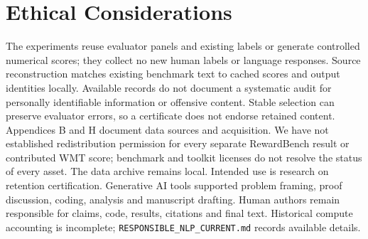 \documentclass[11pt]{article}
\begin{document}
\section*{Ethical Considerations}
The experiments reuse evaluator panels and existing labels or generate controlled numerical scores; they collect no new human labels or language responses. Source reconstruction matches existing benchmark text to cached scores and output identities locally. Available records do not document a systematic audit for personally identifiable information or offensive content. Stable selection can preserve evaluator errors, so a certificate does not endorse retained content. Appendices B and H document data sources and acquisition. We have not established redistribution permission for every separate RewardBench result or contributed WMT score; benchmark and toolkit licenses do not resolve the status of every asset. The data archive remains local. Intended use is research on retention certification. Generative AI tools supported problem framing, proof discussion, coding, analysis and manuscript drafting. Human authors remain responsible for claims, code, results, citations and final text. Historical compute accounting is incomplete; \texttt{RESPONSIBLE\_NLP\_CURRENT.md} records available details.


\end{document}
